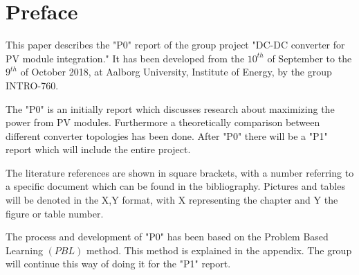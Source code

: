\chapter*{Preface}

This paper describes the "P0" report of the group project "DC-DC converter for PV module integration." It has been developed from the $10^{th}$ of September to the $9^{th}$ of October 2018, at Aalborg University, Institute of Energy, by the group INTRO-760.

The "P0" is an initially report which discusses research about maximizing the power from PV modules.
Furthermore a theoretically comparison between different converter topologies has been done. After "P0" there will be a "P1" report which will include the entire project.

The literature references are shown in square brackets, with a number referring to a specific document which can be found in the bibliography. Pictures and tables will be denoted in the X,Y format, with X representing the chapter and Y the figure or table number. 

The process and development of "P0" has been based on the Problem Based Learning $(PBL)$ method. This method is explained in the appendix. The group will continue this way of doing it for the "P1" report.            
